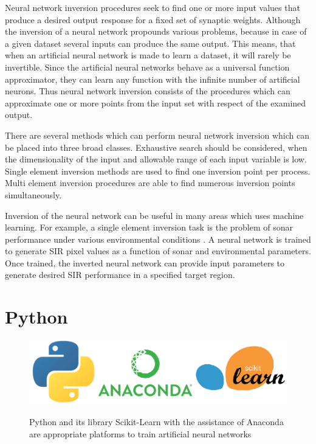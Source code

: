 \label{para:inversion}Neural network inversion procedures seek to find one or more input values that produce a desired output response for a fixed set of synaptic weights. Although the inversion of a neural network propounds various problems, because in case of a given dataset several inputs can produce the same output. This means, that when an artificial neural network is made to learn a dataset, it will rarely be invertible. Since the artificial neural networks behave as a universal function approximator, they can learn any function with the infinite number of artificial neurons. Thus neural network inversion consists of the procedures which can approximate one or more points from the input set with respect of the examined output. \medskip

There are several methods which can perform neural network inversion which can be placed into three broad classes. Exhaustive search should be considered, when the dimensionality of the input and allowable range of each input variable is low. Single element inversion methods are used to find one inversion point per process. Multi element inversion procedures are able to find numerous inversion points simultaneously. \medskip

Inversion of the neural network can be useful in many areas which uses machine learning. For example, a single element inversion task is the problem of sonar performance under various environmental conditions \cite{article}. A neural network is trained to generate SIR pixel values as a function of sonar and environmental parameters. Once trained, the inverted neural network can provide input parameters to generate desired SIR performance in a specified target region.



\section{Python}

\begin{figure}[h]
	\centering
	\caption{Python and its library Scikit-Learn with the assistance of Anaconda are appropriate platforms to train artificial neural networks}
	\includegraphics[height=0.25\linewidth]{./figures/python_scikit}
	\label{fig:python_scikit}
\end{figure}

